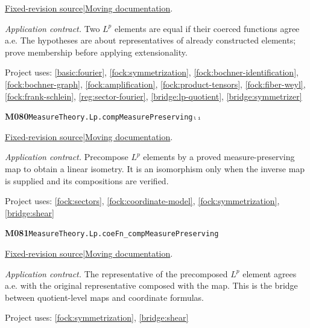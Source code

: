 \documentclass[11pt,a4paper]{article}
\theoremstyle{definition}
\theoremstyle{remark}
\begin{document}
\href{https://github.com/leanprover-community/mathlib4/blob/9bac2d0692944a775113f7c130fd5e5b4608a854/Mathlib/MeasureTheory/Function/LpSpace/Basic.lean}{Fixed-revision source}\quad|\quad\href{https://leanprover-community.github.io/mathlib4_docs/Mathlib/MeasureTheory/Function/LpSpace/Basic.html#MeasureTheory.Lp.ext}{Moving documentation}.\par
\noindent\textit{Application contract.} Two $L^p$ elements are equal if their coerced functions agree a.e. The hypotheses are about representatives of already constructed elements; prove membership before applying extensionality.\par
{\small Project uses: \ref{basic:fourier}, \ref{fock:symmetrization}, \ref{fock:bochner-identification}, \ref{fock:bochner-graph}, \ref{fock:amplification}, \ref{fock:product-tensors}, \ref{fock:fiber-weyl}, \ref{fock:frank-schlein}, \ref{reg:sector-fourier}, \ref{bridge:lp-quotient}, \ref{bridge:symmetrizer}}\par\medskip

\noindent\textbf{M080}\label{base:M080}\quad\nolinkurl{MeasureTheory.Lp.compMeasurePreservingₗᵢ}

\href{https://github.com/leanprover-community/mathlib4/blob/9bac2d0692944a775113f7c130fd5e5b4608a854/Mathlib/MeasureTheory/Function/LpSpace/Basic.lean}{Fixed-revision source}\quad|\quad\href{https://leanprover-community.github.io/mathlib4_docs/Mathlib/MeasureTheory/Function/LpSpace/Basic.html#MeasureTheory.Lp.compMeasurePreservingₗᵢ}{Moving documentation}.\par
\noindent\textit{Application contract.} Precompose $L^p$ elements by a proved measure-preserving map to obtain a linear isometry. It is an isomorphism only when the inverse map is supplied and its compositions are verified.\par
{\small Project uses: \ref{fock:sectors}, \ref{fock:coordinate-model}, \ref{fock:symmetrization}, \ref{bridge:shear}}\par\medskip

\noindent\textbf{M081}\label{base:M081}\quad\nolinkurl{MeasureTheory.Lp.coeFn_compMeasurePreserving}

\href{https://github.com/leanprover-community/mathlib4/blob/9bac2d0692944a775113f7c130fd5e5b4608a854/Mathlib/MeasureTheory/Function/LpSpace/Basic.lean}{Fixed-revision source}\quad|\quad\href{https://leanprover-community.github.io/mathlib4_docs/Mathlib/MeasureTheory/Function/LpSpace/Basic.html#MeasureTheory.Lp.coeFn_compMeasurePreserving}{Moving documentation}.\par
\noindent\textit{Application contract.} The representative of the precomposed $L^p$ element agrees a.e. with the original representative composed with the map. This is the bridge between quotient-level maps and coordinate formulas.\par
{\small Project uses: \ref{fock:symmetrization}, \ref{bridge:shear}}\par\medskip
\end{document}
